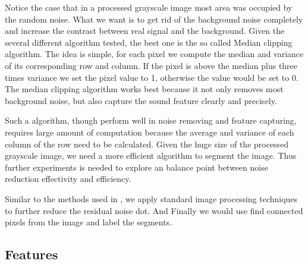 \documentclass{article} %
\begin{document}
Notice the case that in a processed grayscale image most area was occupied by the random noise. What we want is to get rid of the background noise completely and increase the contrast between real signal and the background. Given the several different algorithm tested, the best one is the so called Median clipping algorithm. The idea is simple, for each pixel we compute the median and variance of its corresponding row and column. If the pixel is above the median plus three times variance we set the pixel value to 1, otherwise the value would be set to 0. The median clipping algorithm works best because it not only removes most background noise, but also capture the sound feature clearly and precisely.

Such a algorithm, though perform well in noise removing and feature capturing, requires large amount of computation because the average and variance of each column of the row need to be calculated. Given the huge size of the processed grayscale image, we need a more efficient algorithm to segment the image. Thus further experiments is needed to explore an balance point between noise reduction effectivity and efficiency.

Similar to the methods used in \cite{Lasseck13}, we apply standard image processing techniques to further reduce the residual noise dot. And Finally we would use find connected pixels from the image and label the segments.

\subsection{Features}
\end{document}
